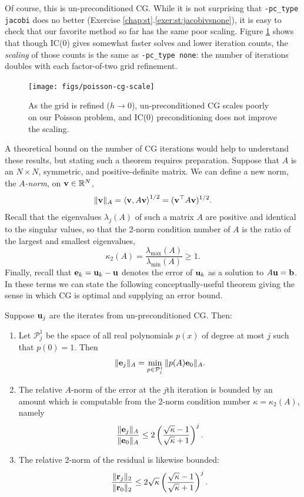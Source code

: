 Of course, this is un-preconditioned CG.  While it is not surprising that \texttt{-pc\_type jacobi} does no better (Exercise \ref{chap:st}.\ref{exer:st:jacobivsnone}), it is easy to check that our favorite method so far has the same poor scaling.  Figure \ref{fig:poisson-cg-scale} shows that though IC($0$) gives somewhat faster solves and lower iteration counts, the \emph{scaling} of those counts is the same as \texttt{-pc\_type none}: the number of iterations doubles with each factor-of-two grid refinement.

\begin{figure}
\bigskip
\texttt{[image: figs/poisson-cg-scale]}
\caption{As the grid is refined ($h\to 0$), un-preconditioned CG scales poorly on our Poisson problem, and IC($0$) preconditioning does not improve the scaling.}
\label{fig:poisson-cg-scale}
\end{figure}

A theoretical bound on the number of CG iterations would help to understand these results, but stating such a theorem requires preparation.  Suppose that $A$ is an $N\times N$, symmetric, and positive-definite matrix.  We can define a new norm, the \emph{$A$-norm}, on $\mathbf{v}\in\mathbb{R}^N$,
\begin{equation}
\|\mathbf{v}\|_A = \left<\mathbf{v},A\mathbf{v}\right>^{1/2} = (\mathbf{v}^\top A\mathbf{v})^{1/2}.  \label{normAdefn}
\end{equation}
Recall that the eigenvalues $\lambda_j(A)$ of such a matrix $A$ are positive and identical to the singular values, so that the 2-norm condition number of $A$ is the ratio of the largest and smallest eigenvalues,
	$$\kappa_2(A) = \frac{\lambda_{\max}(A)}{\lambda_{\min}(A)} \ge 1.$$
Finally, recall that $\mathbf{e}_k = \mathbf{u}_k - \mathbf{u}$ denotes the error of $\mathbf{u}_k$ as a solution to $A\mathbf{u}=\mathbf{b}$.  In these terms we can state the following conceptually-useful theorem giving the sense in which CG is optimal and supplying an error bound.

\renewcommand{\labelenumi}{(\roman{enumi})}
\begin{theorem}  \label{thm:cgiterations}
Suppose $\mathbf{u}_j$ are the iterates from un-preconditioned CG.  Then:\begin{enumerate}
\item Let $\mathcal{P}_j^1$ be the space of all real polynomials $p(x)$ of degree at most $j$ such that $p(0)=1$.  Then
    $$\|\mathbf{e}_j\|_A = \min_{p \in \mathcal{P}_j^1} \|p(A) \mathbf{e}_0\|_A.$$
\item The relative $A$-norm of the error at the $j$th iteration is bounded by an amount which is computable from the 2-norm condition number $\kappa=\kappa_2(A)$, namely
	$$\frac{\|\mathbf{e}_j\|_A}{\|\mathbf{e}_0\|_A} \le 2 \left(\frac{\sqrt{\kappa}-1}{\sqrt{\kappa}+1}\right)^j.$$
\item The relative 2-norm of the residual is likewise bounded:
	$$\frac{\|\mathbf{r}_j\|_2}{\|\mathbf{r}_0\|_2} \le 2 \sqrt{\kappa} \left(\frac{\sqrt{\kappa}-1}{\sqrt{\kappa}+1}\right)^j.$$
\end{enumerate}
\end{theorem}

